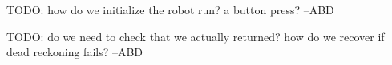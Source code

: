 
\begin{DoxyRefList}
\item[File \mbox{\hyperlink{Syringenator_8py}{Syringenator.py}} ]\label{todo__todo000001}%
%
T\+O\+DO\+: how do we initialize the robot run? a button press? --A\+BD  
\item[Member \mbox{\hyperlink{namespaceSyringenator_afe04905c8a4a9d077457422866633203}{Syringenator.return\+To\+Line}} ()]\label{todo__todo000002}%
%
T\+O\+DO\+: do we need to check that we actually returned? how do we recover if dead reckoning fails? --A\+BD 
\end{DoxyRefList}